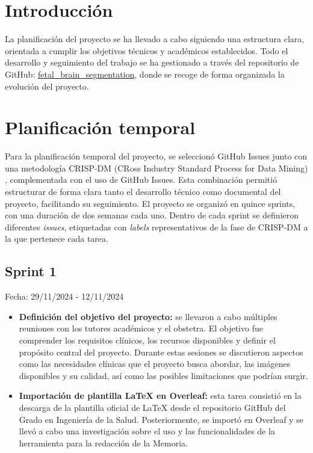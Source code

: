 
\section{Introducción}

La planificación del proyecto se ha llevado a cabo siguiendo una estructura clara, orientada a cumplir los objetivos técnicos y académicos establecidos. Todo el desarrollo y seguimiento del trabajo se ha gestionado a través del repositorio de GitHub: \href{https://github.com/eirarodriguez/fetal_brain_segmentation} {fetal\_brain\_segmentation}, donde se recoge de forma organizada la evolución del proyecto.

\section{Planificación temporal}

Para la planificación temporal del proyecto, se seleccionó GitHub Issues junto con una metodología  CRISP-DM (CRoss Industry Standard Process for Data Mining) \cite{crispdm2021}, complementada con el uso de GitHub Issues. Esta combinación permitió estructurar de forma clara tanto el desarrollo técnico como documental del proyecto, facilitando su seguimiento. El proyecto se organizó en quince sprints, con una duración de dos semanas cada uno. Dentro de cada sprint se definieron diferentes \textit{issues}, etiquetadas con \textit{labels} representativos de la fase de CRISP-DM a la que pertenece cada tarea.
 

\subsection{Sprint 1}
Fecha: 29/11/2024 - 12/11/2024

\begin{itemize}
    \item \textbf{Definición del objetivo del proyecto:} se llevaron a cabo múltiples reuniones con los tutores académicos y el obstetra. El objetivo fue comprender los requisitos clínicos, los recursos disponibles y definir el propósito central del proyecto. Durante estas sesiones se discutieron aspectos como las necesidades clínicas que el proyecto busca abordar, las imágenes disponibles y su calidad, así como las posibles limitaciones que podrían surgir.

    \item \textbf{Importación de plantilla LaTeX en Overleaf:} esta tarea consistió en la descarga de la plantilla oficial de LaTeX desde el repositorio GitHub del Grado en Ingeniería de la Salud. Posteriormente, se importó en Overleaf y se llevó a cabo una investigación sobre el uso y las funcionalidades de la herramienta para la redacción de la Memoria.
    
\end{itemize}

